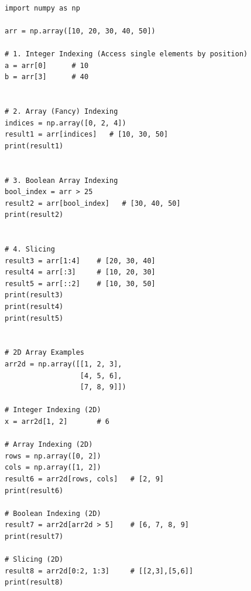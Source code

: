 \begin{verbatim}

import numpy as np

arr = np.array([10, 20, 30, 40, 50])

# 1. Integer Indexing (Access single elements by position)
a = arr[0]      # 10
b = arr[3]      # 40


# 2. Array (Fancy) Indexing
indices = np.array([0, 2, 4])
result1 = arr[indices]   # [10, 30, 50]
print(result1)


# 3. Boolean Array Indexing
bool_index = arr > 25
result2 = arr[bool_index]   # [30, 40, 50]
print(result2)


# 4. Slicing
result3 = arr[1:4]    # [20, 30, 40]
result4 = arr[:3]     # [10, 20, 30]
result5 = arr[::2]    # [10, 30, 50]
print(result3)
print(result4)
print(result5)


# 2D Array Examples
arr2d = np.array([[1, 2, 3],
                  [4, 5, 6],
                  [7, 8, 9]])

# Integer Indexing (2D)
x = arr2d[1, 2]       # 6

# Array Indexing (2D)
rows = np.array([0, 2])
cols = np.array([1, 2])
result6 = arr2d[rows, cols]   # [2, 9]
print(result6)

# Boolean Indexing (2D)
result7 = arr2d[arr2d > 5]    # [6, 7, 8, 9]
print(result7)

# Slicing (2D)
result8 = arr2d[0:2, 1:3]     # [[2,3],[5,6]]
print(result8)
\end{verbatim}